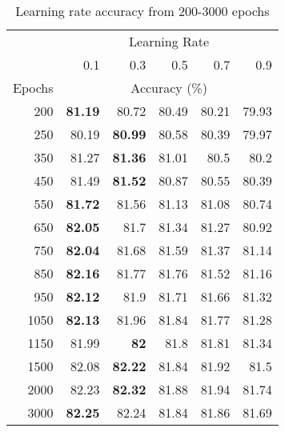 \documentclass[12pt]{article}
\begin{document}
\begin{table}[htbp]
  \centering
  \caption{Learning rate accuracy from 200-3000 epochs}
    \begin{tabular}{r|rrrrr}
    \toprule
    \multicolumn{1}{r}{} & \multicolumn{5}{|c}{Learning Rate} \\
    & 0.1   & 0.3   & 0.5   & 0.7   & 0.9 \\
    \midrule
        Epochs & \multicolumn{5}{|c}{Accuracy (\%)} \\
    \midrule
    200   & \textbf{81.19} & 80.72 & 80.49 & 80.21 & 79.93 \\
    250   & 80.19 & \textbf{80.99} & 80.58 & 80.39 & 79.97 \\
    350   & 81.27 & \textbf{81.36} & 81.01 & 80.5  & 80.2 \\
    450   & 81.49 & \textbf{81.52} & 80.87 & 80.55 & 80.39 \\
    550   & \textbf{81.72} & 81.56 & 81.13 & 81.08 & 80.74 \\
    650   & \textbf{82.05} & 81.7  & 81.34 & 81.27 & 80.92 \\
    750   & \textbf{82.04} & 81.68 & 81.59 & 81.37 & 81.14 \\
    850   & \textbf{82.16} & 81.77 & 81.76 & 81.52 & 81.16 \\
    950   & \textbf{82.12} & 81.9  & 81.71 & 81.66 & 81.32 \\
    1050  & \textbf{82.13} & 81.96 & 81.84 & 81.77 & 81.28 \\
    1150  & 81.99 & \textbf{82} & 81.8  & 81.81 & 81.34 \\
    1500  & 82.08 & \textbf{82.22} & 81.84 & 81.92 & 81.5 \\
    2000  & 82.23 & \textbf{82.32} & 81.88 & 81.94 & 81.74 \\
    3000  & \textbf{82.25} & 82.24 & 81.84 & 81.86 & 81.69 \\
    \bottomrule
    \end{tabular}%
  \label{tab:addlabel}%
\end{table}%
\end{document}

